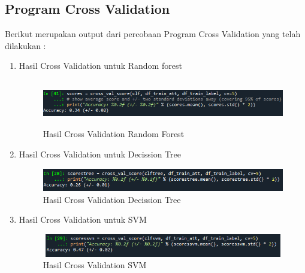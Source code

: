 \subsection{Program Cross Validation}
Berikut merupakan output dari percobaan Program Cross Validation yang telah dilakukan :
\begin{enumerate}
    \item Hasil Cross Validation untuk Random forest
    \begin{figure}[!htbp]
        \centering
        \includegraphics[width=14cm,height=2cm]{figures/cv_randomforest.PNG}
        \caption{Hasil Cross Validation Random Forest}
        \label{penanda}
    \end{figure}
    \item Hasil Cross Validation untuk Decission Tree
    \begin{figure}[!htbp]
        \centering
        \includegraphics[width=14cm,height=1cm]{figures/cv_tree.PNG}
        \caption{Hasil Cross Validation Decission Tree}
        \label{penanda}
    \end{figure}
    \item Hasil Cross Validation untuk SVM  
    \begin{figure}
        \centering
        \includegraphics[width=14cm,height=1cm]{figures/cv_svm.PNG}
        \caption{Hasil Cross Validation SVM}
        \label{penanda}
    \end{figure}
\end{enumerate}


